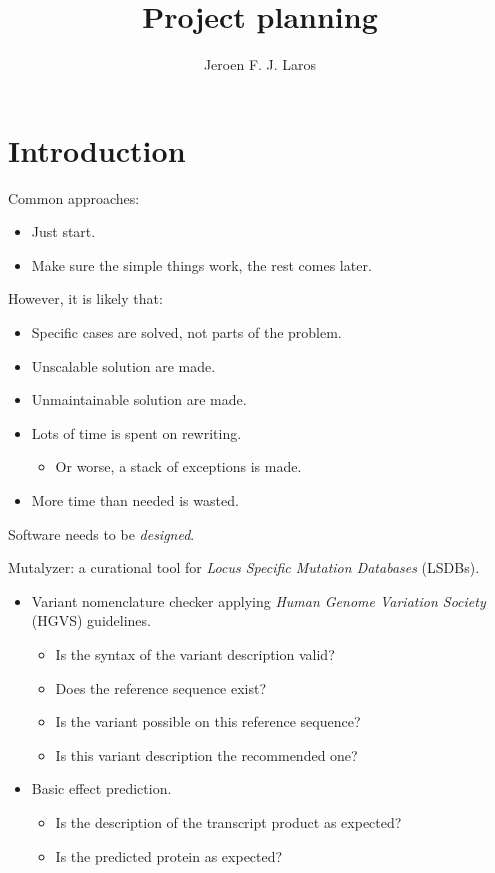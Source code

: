 \documentclass[slidestop]{beamer}
\title{Project planning}
\author{Jeroen F. J. Laros}
\begin{document}

\bodytemplate

\section{Introduction}
\begin{frame}
  Common approaches:
  \begin{itemize}
    \item Just start.
    \item Make sure the simple things work, the rest comes later.
  \end{itemize}
  \bigskip
  \pause

  However, it is likely that:
  \begin{itemize}
    \item Specific cases are solved, not parts of the problem.
    \item Unscalable solution are made.
    \item Unmaintainable solution are made.
    \item Lots of time is spent on rewriting.
    \begin{itemize}
      \item Or worse, a stack of exceptions is made.
    \end{itemize}
    \item More time than needed is wasted.
  \end{itemize}
  \bigskip
  \pause

  Software needs to be \emph{designed}.
\end{frame}

\begin{frame}
  Mutalyzer: a curational tool for \emph{Locus Specific Mutation Databases}
  (LSDBs).

  \bigskip
  \begin{itemize}
    \pause
    \item Variant nomenclature checker applying \emph{Human Genome Variation
          Society} (HGVS) guidelines.
    \begin{itemize}
      \item Is the syntax of the variant description valid?
      \item Does the reference sequence exist?
      \item Is the variant possible on this reference sequence?
      \item Is this variant description the recommended one?
    \end{itemize}
    \pause
    \item Basic effect prediction.
    \begin{itemize}
      \item Is the description of the transcript product as expected?
      \item Is the predicted protein as expected?
    \end{itemize}
  \end{itemize}
\end{frame}
\end{document}
